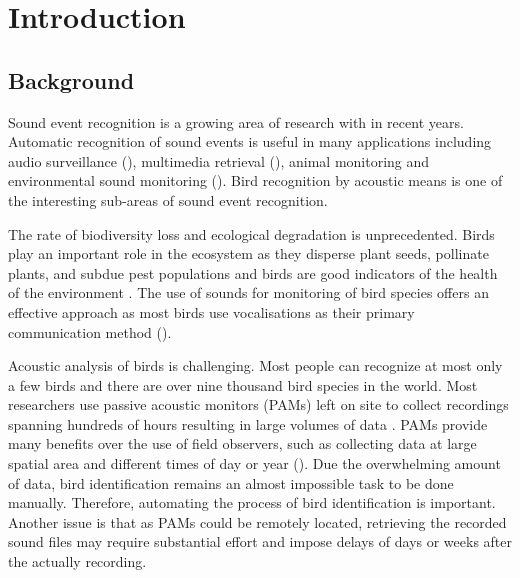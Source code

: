 \chapter{Introduction}

\section{Background}



Sound event recognition is a growing area of research with in recent years.
Automatic recognition of sound events is useful in many applications including audio surveillance (\cite{Foggia2015}), multimedia retrieval (\cite{Wold1996}), animal monitoring \citep{Mcloughlin2019} and environmental sound monitoring (\cite{Chu2009}).
Bird recognition by acoustic means is one of the interesting sub-areas of sound event recognition.

The rate of biodiversity loss and ecological degradation is unprecedented. 
Birds play an important role in the ecosystem as they disperse plant seeds, pollinate plants, and subdue pest populations and birds are good indicators of the health of the environment \citep{Priyadarshani2018}.
The use of sounds for monitoring of bird species offers an effective approach as most birds use vocalisations as their primary communication method (\cite{Gregory2010}).

Acoustic analysis of birds is challenging. Most people can recognize at most only a few birds and there are over nine thousand bird species in the world.
Most researchers use passive acoustic monitors (PAMs) left on site to collect recordings spanning hundreds of hours resulting in large volumes of data \citep{Sugai2019}. 
PAMs provide many benefits over the use of field observers, such as collecting data at large spatial area and different times of day or year (\cite{Digby2013}).
Due the overwhelming amount of data, bird identification remains an almost impossible task to be done manually.
Therefore, automating the process of bird identification is important.
Another issue is that as PAMs could be remotely located, retrieving the recorded sound files may require substantial effort and impose delays of days or weeks after the actually recording.


